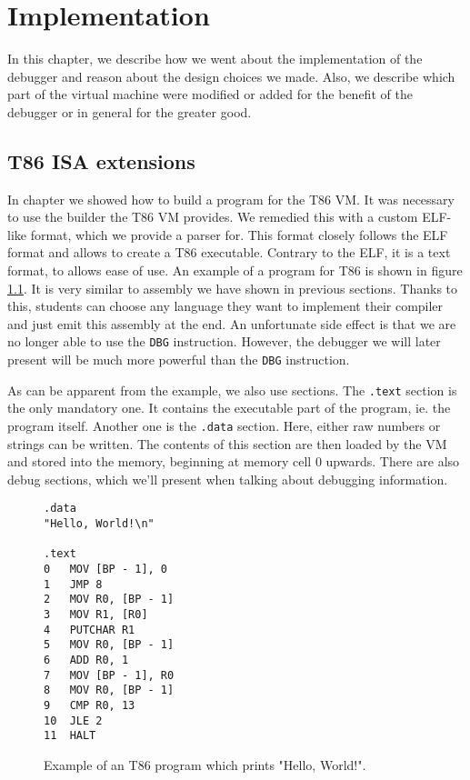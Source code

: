\chapter{Implementation}
In this chapter, we describe how we went about the implementation
of the debugger and reason about the design choices we made.
Also, we describe which part of the virtual machine were
modified or added for the benefit of the debugger or in
general for the greater good.

\section{T86 ISA extensions}\label{section:parser}
In chapter  we showed how to build a program for the T86 VM. It was
necessary to use the builder the T86 VM provides. We remedied this with a
custom ELF-like format, which we provide a parser for. This format closely
follows the ELF format and allows to create a T86 executable. Contrary to the
ELF, it is a text format, to allows ease of use. An example of a program for
T86 is shown in figure \ref{fig:t86-program}. It is very similar to assembly we
have shown in previous sections. Thanks to this, students can choose any
language they want to implement their compiler and just emit this assembly at
the end. An unfortunate side effect is that we are no longer able to use the
\texttt{DBG} instruction. However, the debugger we will later present will be
much more powerful than the \texttt{DBG} instruction.

As can be apparent from the example, we also use sections. The \texttt{.text}
section is the only mandatory one. It contains the executable part of the
program, ie. the program itself. Another one is the \texttt{.data} section.
Here, either raw numbers or strings can be written. The contents of this
section are then loaded by the VM and stored into the memory, beginning at
memory cell 0 upwards. There are also debug sections, which we'll present when
talking about debugging information.

\begin{figure}
    \begin{lstlisting}
.data
"Hello, World!\n"

.text
0   MOV [BP - 1], 0
1   JMP 8
2   MOV R0, [BP - 1]
3   MOV R1, [R0]
4   PUTCHAR R1
5   MOV R0, [BP - 1]
6   ADD R0, 1
7   MOV [BP - 1], R0
8   MOV R0, [BP - 1]
9   CMP R0, 13
10  JLE 2
11  HALT
    \end{lstlisting}
    \caption{Example of an T86 program which prints "Hello, World!".}
    \label{fig:t86-program}
\end{figure}

